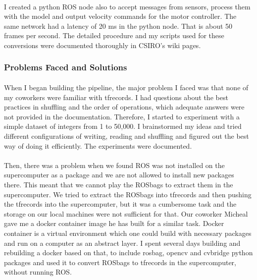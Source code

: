 \paragraph{}
I created a python ROS node also to accept messages from sensors, process them with the model and output velocity commands for the motor controller. The same network had a latency of 20 ms in the python node. That is about 50 frames per second. The detailed procedure and my scripts used for these conversions were documented thoroughly in CSIRO's wiki pages. 



\subsubsection{Problems Faced and Solutions}

\paragraph{}
When I began building the pipeline, the major problem I faced was that none of my coworkers were familiar with tfrecords. I had questions about the best practices in shuffling and the order of operations, which adequate answers were not provided in the documentation. Therefore, I started to experiment with a simple dataset of integers from 1 to 50,000. I brainstormed my ideas and tried different configurations of writing, reading and shuffling and figured out the best way of doing it efficiently. The experiments were documented.

\paragraph{}
Then, there was a problem when we found ROS was not installed on the supercomputer as a package and we are not allowed to install new packages there. This meant that we cannot play the ROSbags to extract them in the supercomputer. We tried to extract the ROSbags into tfrecords and then pushing the tfrecords into the supercomputer, but it was a cumbersome task and the storage on our local machines were not sufficient for that. Our coworker Micheal gave me a docker container image he has built for a similar task. Docker container is a virtual environment which one could build with necessary packages and run on a computer as an abstract layer. I spent several days building and rebuilding a docker based on that, to include rosbag, opencv and cvbridge python packages and used it to convert ROSbags to tfrecords in the supercomputer, without running ROS. 


